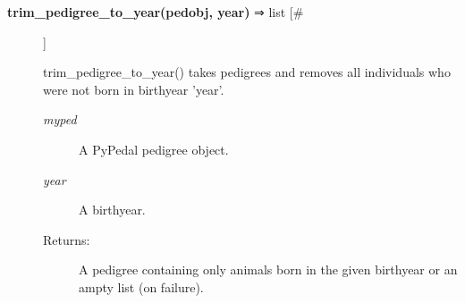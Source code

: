 \begin{description}
\item[\textbf{trim\_pedigree\_to\_year(pedobj, year)} ⇒ list [\#]
]
\par trim\_pedigree\_to\_year() takes pedigrees and removes all individuals who were not born
in birthyear 'year'.
\begin{description}
\item[\textit{myped}
]
A PyPedal pedigree object.
\item[\textit{year}
]
A birthyear.
\item[Returns:
]
A pedigree containing only animals born in the given birthyear or an ampty list (on failure).
\end{description}\\

\end{description}
